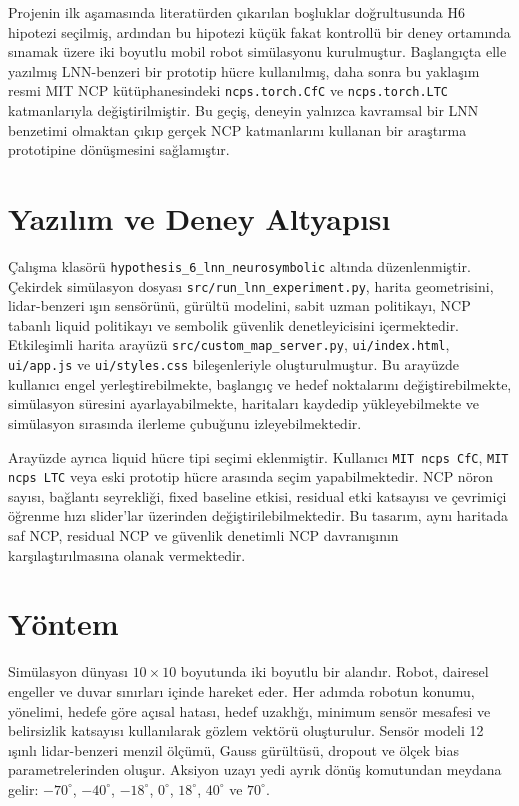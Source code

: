 \documentclass[11pt,a4paper]{article}
\begin{document}
Projenin ilk aşamasında literatürden çıkarılan boşluklar doğrultusunda H6 hipotezi seçilmiş, ardından bu hipotezi küçük fakat kontrollü bir deney ortamında sınamak üzere iki boyutlu mobil robot simülasyonu kurulmuştur. Başlangıçta elle yazılmış LNN-benzeri bir prototip hücre kullanılmış, daha sonra bu yaklaşım resmi MIT NCP kütüphanesindeki \texttt{ncps.torch.CfC} ve \texttt{ncps.torch.LTC} katmanlarıyla değiştirilmiştir. Bu geçiş, deneyin yalnızca kavramsal bir LNN benzetimi olmaktan çıkıp gerçek NCP katmanlarını kullanan bir araştırma prototipine dönüşmesini sağlamıştır.

\section{Yazılım ve Deney Altyapısı}

Çalışma klasörü \texttt{hypothesis\_6\_lnn\_neurosymbolic} altında düzenlenmiştir. Çekirdek simülasyon dosyası \texttt{src/run\_lnn\_experiment.py}, harita geometrisini, lidar-benzeri ışın sensörünü, gürültü modelini, sabit uzman politikayı, NCP tabanlı liquid politikayı ve sembolik güvenlik denetleyicisini içermektedir. Etkileşimli harita arayüzü \texttt{src/custom\_map\_server.py}, \texttt{ui/index.html}, \texttt{ui/app.js} ve \texttt{ui/styles.css} bileşenleriyle oluşturulmuştur. Bu arayüzde kullanıcı engel yerleştirebilmekte, başlangıç ve hedef noktalarını değiştirebilmekte, simülasyon süresini ayarlayabilmekte, haritaları kaydedip yükleyebilmekte ve simülasyon sırasında ilerleme çubuğunu izleyebilmektedir.

Arayüzde ayrıca liquid hücre tipi seçimi eklenmiştir. Kullanıcı \texttt{MIT ncps CfC}, \texttt{MIT ncps LTC} veya eski prototip hücre arasında seçim yapabilmektedir. NCP nöron sayısı, bağlantı seyrekliği, fixed baseline etkisi, residual etki katsayısı ve çevrimiçi öğrenme hızı slider'lar üzerinden değiştirilebilmektedir. Bu tasarım, aynı haritada saf NCP, residual NCP ve güvenlik denetimli NCP davranışının karşılaştırılmasına olanak vermektedir.

\section{Yöntem}

Simülasyon dünyası \(10 \times 10\) boyutunda iki boyutlu bir alandır. Robot, dairesel engeller ve duvar sınırları içinde hareket eder. Her adımda robotun konumu, yönelimi, hedefe göre açısal hatası, hedef uzaklığı, minimum sensör mesafesi ve belirsizlik katsayısı kullanılarak gözlem vektörü oluşturulur. Sensör modeli \num{12} ışınlı lidar-benzeri menzil ölçümü, Gauss gürültüsü, dropout ve ölçek bias parametrelerinden oluşur. Aksiyon uzayı yedi ayrık dönüş komutundan meydana gelir: \(-70^\circ\), \(-40^\circ\), \(-18^\circ\), \(0^\circ\), \(18^\circ\), \(40^\circ\) ve \(70^\circ\).
\end{document}
